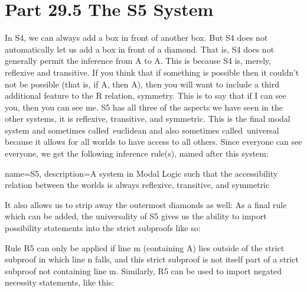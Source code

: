\section{Part 29.5 The S5 System}
In S4, we can always add a box in front of another box. But S4 does not automatically let us add a box in front of a diamond. That is, S4 does not generally permit the inference from \ediamond A to \ebox \ediamond A. This is because S4 is, merely, reflexive and transitive. If you think that if something is possible then it couldn't not be possible (that is, if \ediamond A, then \ebox \ediamond A), then you will want to include a third additional feature to the R relation, symmetry. This is to say that if I can see you, then you can see me. \Gls{S5} has all three of the aspects we have seen in the other systems, it is reflexive, transitive, and symmetric. This is the final modal system and sometimes called euclidean and also sometimes called universal because it allows for all worlds to have access to all others. Since everyone can see everyone, we get the following inference rule(s), named after this system:\autocite[170]{Sider}

{
name=S5,
description={A system in Modal Logic such that the \gls{accessibility relation} between the \glspl{world} is always \gls{reflexive}, \gls{transitive}, and \gls{symmetric}}
}


It also allows us to strip away the outermost diamonds as well:
As a final rule which can be added, the universality of S5 gives us the ability to import possibility statements into the strict subproofs like so:

Rule R5 can only be applied if line m (containing \ediamond A) lies outside of the strict subproof in which line n falls, and this strict subproof is not itself part of a strict subproof not containing line m. Similarly, R5 can be used to import negated necessity statements, like this:
\begin{fitchproof}
\open
{} 
\end{fitchproof}

